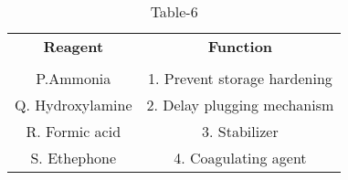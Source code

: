 \begin{table}[htbp]
  \centering
  \caption{Table-6}
  \label{tab:tables/table6.tex}
  \begin{tabular}{cc}
  \textbf{Reagent} & \textbf{Function} \\ \\
    P.Ammonia  & 1. Prevent storage hardening \\
    Q. Hydroxylamine & 2. Delay plugging mechanism \\
    R. Formic acid & 3. Stabilizer \\
    S. Ethephone & 4. Coagulating agent \\
  \end{tabular}
\end{table}